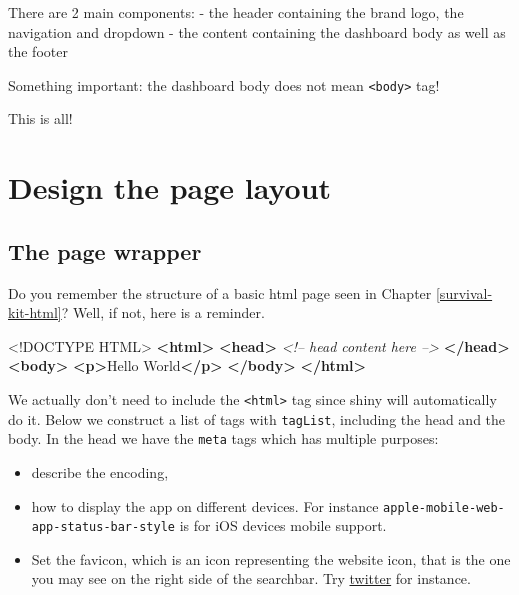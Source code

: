 \documentclass[
]{book}
\newenvironment{Shaded}{\begin{snugshade}}{\end{snugshade}}
\newcommand{\CommentTok}[1]{\textcolor[rgb]{0.56,0.35,0.01}{\textit{#1}}}
\newcommand{\DataTypeTok}[1]{\textcolor[rgb]{0.13,0.29,0.53}{#1}}
\newcommand{\KeywordTok}[1]{\textcolor[rgb]{0.13,0.29,0.53}{\textbf{#1}}}
\newcommand{\NormalTok}[1]{#1}
\providecommand{\tightlist}{%
  \setlength{\itemsep}{0pt}\setlength{\parskip}{0pt}}
\begin{document}
There are 2 main components:
- the header containing the brand logo, the navigation and dropdown
- the content containing the dashboard body as well as the footer

Something important: the dashboard body does not mean \texttt{\textless{}body\textgreater{}} tag!

This is all!

\hypertarget{design-the-page-layout}{%
\section{Design the page layout}\label{design-the-page-layout}}

\hypertarget{the-page-wrapper}{%
\subsection{The page wrapper}\label{the-page-wrapper}}

Do you remember the structure of a basic html page seen in Chapter \ref{survival-kit-html}? Well, if not, here is a reminder.

\begin{Shaded}
\begin{Highlighting}[]
\DataTypeTok{<!DOCTYPE }\NormalTok{HTML}\DataTypeTok{>}
\KeywordTok{<html>}
  \KeywordTok{<head>}
  \CommentTok{<!-- head content here -->}
  \KeywordTok{</head>}
  \KeywordTok{<body>}
    \KeywordTok{<p>}\NormalTok{Hello World}\KeywordTok{</p>}
  \KeywordTok{</body>}
\KeywordTok{</html>}
\end{Highlighting}
\end{Shaded}

We actually don't need to include the \texttt{\textless{}html\textgreater{}} tag since shiny will automatically do it. Below we construct a list of tags with \texttt{tagList}, including the head and the body. In the head we have the \texttt{meta} tags which has multiple purposes:

\begin{itemize}
\tightlist
\item
  describe the encoding,
\item
  how to display the app on different devices. For instance \texttt{apple-mobile-web-app-status-bar-style} is for iOS devices mobile support.
\item
  Set the favicon, which is an icon representing the website icon, that is the one you may see on the right side of the searchbar. Try \href{https://twitter.com/home}{twitter} for instance.
\end{itemize}
\end{document}
